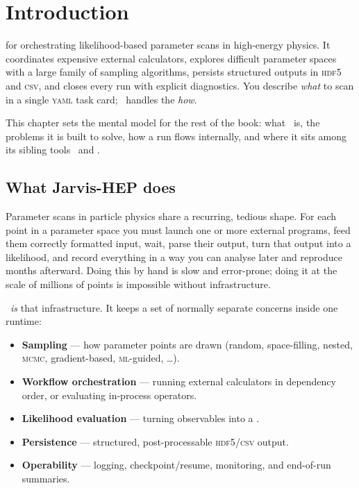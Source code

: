 \chapter{Introduction}
\label{ch:introduction}

 for orchestrating likelihood-based
parameter scans in high-energy physics. It coordinates expensive external
calculators, explores difficult parameter spaces with a large family of sampling
algorithms, persists structured outputs in \textsc{hdf5} and \textsc{csv}, and closes every
run with explicit diagnostics. You describe \emph{what} to scan in a single \textsc{yaml}
task card; \Jarvis\ handles the \emph{how}.

This chapter sets the mental model for the rest of the book: what \Jarvis\ is, the problems
it is built to solve, how a run flows internally, and where it sits among its sibling tools
\Operas\ and \JPlot.

\section{What Jarvis-HEP does}
\label{sec:what-it-does}

Parameter scans in particle physics share a recurring, tedious shape. For each point in a
parameter space you must launch one or more external programs, feed them correctly formatted
input, wait, parse their output, turn that output into a likelihood, and record everything in
a way you can analyse later and reproduce months afterward. Doing this by hand is slow and
error-prone; doing it at the scale of millions of points is impossible without
infrastructure.\cite{Guo:2026kfy}

\Jarvis\ \emph{is} that infrastructure. It keeps a set of normally separate concerns inside
one runtime:

\begin{itemize}
  \item \textbf{Sampling} --- how parameter points are drawn (random, space-filling, nested,
        \textsc{mcmc}, gradient-based, \textsc{ml}-guided, \ldots).
  \item \textbf{Workflow orchestration} --- running external calculators in dependency order,
        or evaluating in-process operators.
  \item \textbf{Likelihood evaluation} --- turning observables into a .
  \item \textbf{Persistence} --- structured, post-processable \textsc{hdf5}/\textsc{csv} output.
  \item \textbf{Operability} --- logging, checkpoint/resume, monitoring, and end-of-run summaries.
\end{itemize}

